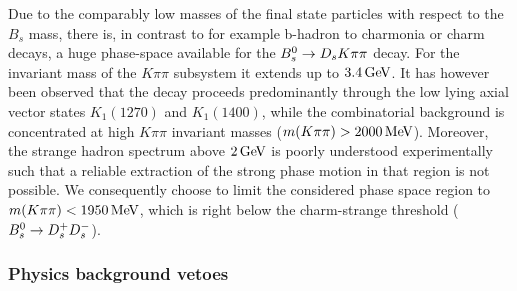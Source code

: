 Due to the comparably low masses of the final state particles  with respect to the $B_s$ mass,
there is, in contrast to for example b-hadron to charmonia or charm decays, a huge phase-space available for the ${{B}^0_{s}}\rightarrow{\ensuremath{{D}_{s}}}{\ensuremath{K}}{\ensuremath{\pi}}{\ensuremath{\pi}}$ decay.
For the invariant mass of the $K\pi\pi$ subsystem it extends up to $3.4 \mathrm{\,Ge\kern -0.1em V}$.
It has however been observed that the decay proceeds predominantly through the low lying axial vector states $K_{1}(1270)$ and $K_{1}(1400)$, while
the combinatorial background is concentrated at high $K\pi\pi$ invariant masses ($m(K\pi\pi) > 2000 \mathrm{\,Me\kern -0.1em V}$).
Moreover, the strange hadron spectrum above $2\mathrm{\,Ge\kern -0.1em V}$ is poorly understood experimentally such that a reliable extraction of the strong phase motion in that region is not possible.
We consequently choose to limit the considered phase space region to $m(K\pi\pi) < 1950 \mathrm{\,Me\kern -0.1em V}$, which is right below the charm-strange threshold (${{B}^0_{s}}\rightarrow{\ensuremath{{D}^+_{s}}}{\ensuremath{{D}^-_{s}}}$).
 
 \clearpage
\subsubsection{Physics background vetoes}
 \label{ssec:vetoes}


